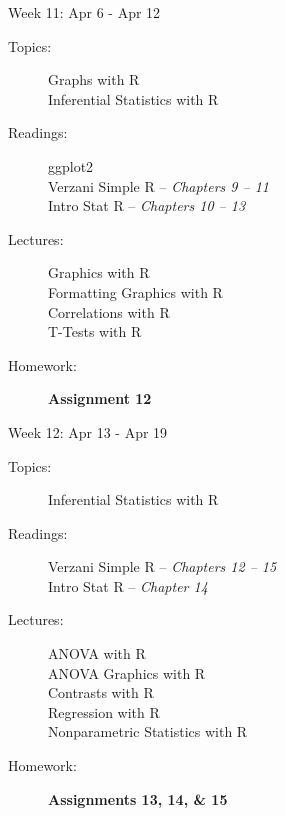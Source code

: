 \documentclass[11pt,article,oneside]{memoir}
\newcounter{schedule}
\begin{document}
\begin{schedule}{Week 11: Apr 6 - Apr 12}
\begin{description}
\item[Topics:] Graphs with R \\Inferential Statistics with R

\item[Readings:] ggplot2 \\ Verzani Simple R -- \textit{Chapters 9 -- 11} \\Intro Stat R -- \textit{Chapters 10 -- 13}

\item[Lectures:] Graphics with R \\ Formatting Graphics with R \\ Correlations with R \\ T-Tests with R

\item[Homework:] \textbf{Assignment 12}

\end{description}
\end{schedule}
\begin{schedule}{Week 12: Apr 13 - Apr 19}
\begin{description}
\item[Topics:] Inferential Statistics with R

\item[Readings:] Verzani Simple R -- \textit{Chapters 12 -- 15} \\Intro Stat R -- \textit{Chapter 14}

\item[Lectures:] ANOVA with R \\ ANOVA Graphics with R \\ Contrasts with R \\ Regression with R \\ Nonparametric Statistics with R

\item[Homework:] \textbf{Assignments 13, 14, \& 15}

\end{description}
\end{schedule}
\end{document}
